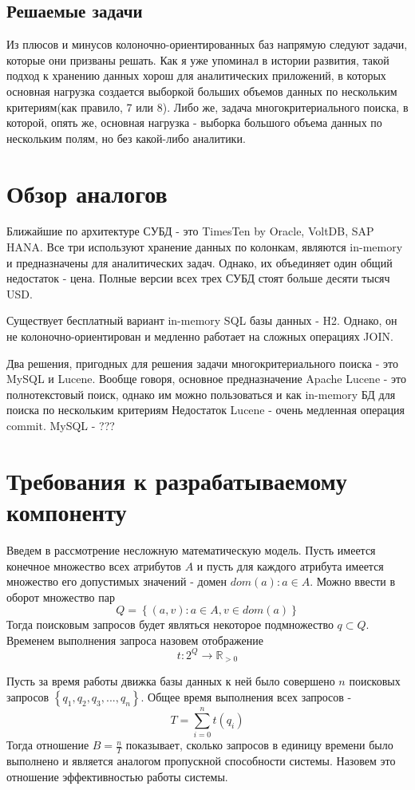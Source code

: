 \documentclass{matmex-diploma}
\begin{document}
\subsection{Решаемые задачи}
    Из плюсов и минусов колоночно-ориентированных баз напрямую следуют задачи, которые они призваны решать. Как я уже упоминал в истории развития, такой подход к хранению данных хорош для аналитических приложений, в которых основная нагрузка создается выборкой больших объемов данных по нескольким критериям(как правило, 7 или 8). Либо же, задача многокритериального поиска, в которой, опять же, основная нагрузка - выборка большого объема данных по нескольким полям, но без какой-либо аналитики.  %
\section{Обзор аналогов}
    Ближайшие по архитектуре СУБД - это TimesTen by Oracle, VoltDB, SAP HANA. Все три используют хранение данных по колонкам, являются in-memory и предназначены для аналитических задач. Однако, их объединяет один общий недостаток - цена. Полные версии всех трех СУБД стоят больше десяти тысяч USD.
    
    Существует бесплатный вариант in-memory SQL базы данных - H2. Однако, он не колоночно-ориентирован и медленно работает на сложных операциях JOIN.
    
    Два решения, пригодных для решения задачи многокритериального поиска - это MySQL и Lucene. Вообще говоря, основное предназначение Apache Lucene - это полнотекстовый поиск, однако им можно пользоваться и как in-memory БД для поиска по нескольким критериям  Недостаток Lucene - очень медленная операция commit. MySQL - ??? 
\section{Требования к разрабатываемому компоненту}
    Введем в рассмотрение несложную математическую модель. Пусть имеется конечное множество всех атрибутов $A$ и пусть для каждого атрибута имеется множество его допустимых значений - домен $dom(a) : a \in A$. Можно ввести в оборот множество пар $$ Q = \left\{ (a, v) : a \in A, v \in dom(a) \right\} $$
    Тогда поисковым запросов будет являться некоторое подмножество $ q \subset Q $. Временем выполнения запроса назовем отображение $$ t : 2^Q \to \mathbb{R}_{>0} $$
    
    Пусть за время работы движка базы данных к ней было совершено $n$ поисковых запросов $\left\{ q_1, q_2, q_3, ... , q_n \right\} $. Общее время выполнения всех запросов - $$ T = \sum_{i=0}^n t(q_i) $$
    Тогда отношение $B = \frac{n}{T} $ показывает, сколько запросов в единицу времени было выполнено и является аналогом пропускной способности системы. Назовем это отношение эффективностью работы системы. 
    
\end{document}

